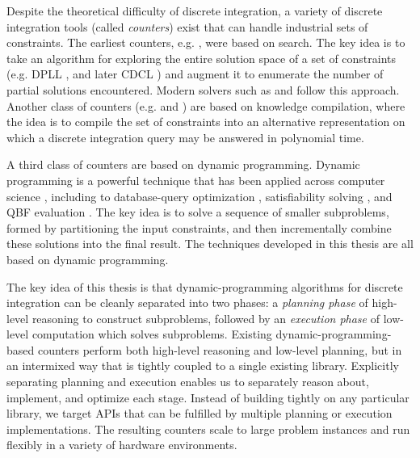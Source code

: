 Despite the theoretical difficulty of discrete integration, a variety of discrete integration tools (called \emph{counters}) exist that can handle industrial sets of constraints. The earliest counters, e.g.  \cite{birnbaum1999good}, were based on search.
The key idea is to take an algorithm for exploring the entire solution space of a set of constraints (e.g. DPLL \cite{davis1960computing,davis1962machine}, and later CDCL \cite{biere2009conflict}) and augment it to enumerate the number of partial solutions encountered. 
Modern solvers such as  \cite{SBK05} and  \cite{Thurley2006} follow this approach.
Another class of counters (e.g.  \cite{OD15} and  \cite{LM17}) are based on knowledge compilation, where the idea is to compile the set of constraints into an alternative representation on which a discrete integration query may be answered in polynomial time.

A third class of counters \cite{CW16,FHMW17,FHWZ18,FHZ19,DPV20,fichte2020exploiting} are based on dynamic programming. %
Dynamic programming is a powerful technique that has been applied across computer science \cite{bellman1966dynamic}, including to database-query optimization \cite{MPPV04}, satisfiability solving \cite{uribe1994ordered,aguirre2001random,pan2005symbolic}, and QBF evaluation \cite{charwat2016bdd}.
The key idea is to solve a sequence of smaller subproblems, formed by partitioning the input constraints, and then incrementally combine these solutions into the final result.
The techniques developed in this thesis are all based on dynamic programming.

The key idea of this thesis is that dynamic-programming algorithms for discrete integration can be cleanly separated into two phases: a \emph{planning phase} of high-level reasoning to construct subproblems, followed by an \emph{execution phase} of low-level computation which solves subproblems.
Existing dynamic-programming-based counters perform both high-level reasoning and low-level planning, but in an intermixed way that is tightly coupled to a single existing library.
Explicitly separating planning and execution enables us to separately reason about, implement, and optimize each stage.
Instead of building tightly on any particular library, we target APIs that can be fulfilled by multiple planning or execution implementations.
The resulting counters scale to large problem instances and run flexibly in a variety of hardware environments.

